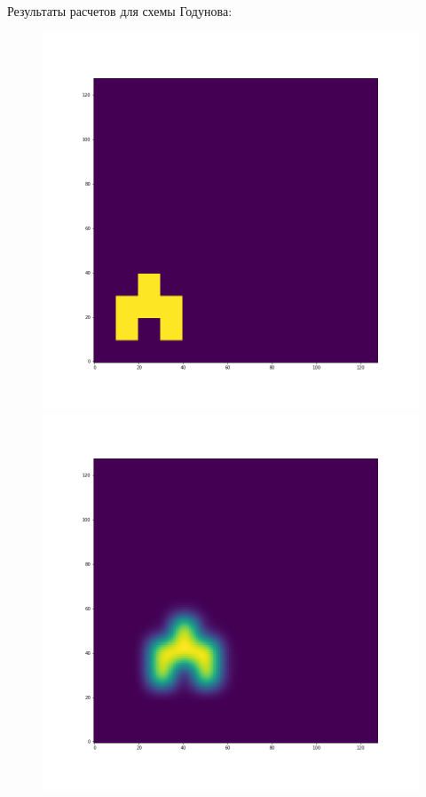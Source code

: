 \documentclass[12pt,a4paper]{article}
\begin{document}
Результаты расчетов для схемы Годунова:

\begin{figure}[H]
\centering
\begin{minipage}{.3\textwidth}
  \centering
  \includegraphics[width=\linewidth]{Pictures/Solve2DWhiteBearMovementTestGodunov/Solve2DWhiteBearMovementTest_t0.png}
\end{minipage}%
\begin{minipage}{.3\textwidth}
  \centering
  \includegraphics[width=\linewidth]{Pictures/Solve2DWhiteBearMovementTestGodunov/Solve2DWhiteBearMovementTest_t10.png}

\end{minipage}
\end{figure}
\end{document}
